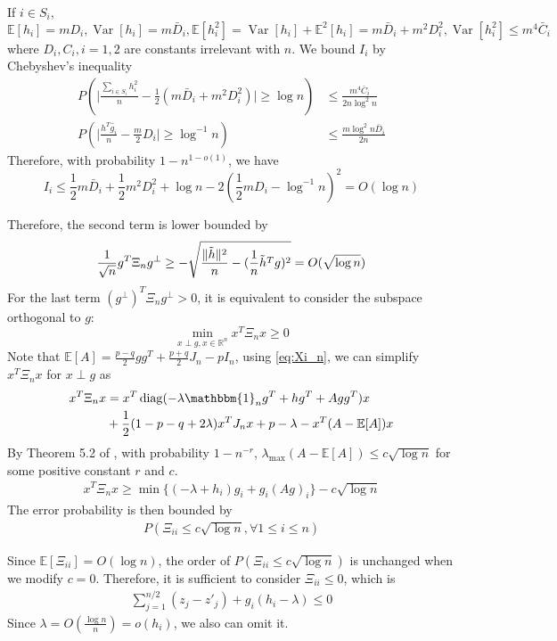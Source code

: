 \documentclass{article}
\DeclarePairedDelimiter\norm{\lVert}{\rVert}
\DeclareMathOperator{\Var}{Var}
\DeclareMathOperator{\diag}{diag}
\begin{document}
If $i\in S_i$, $\mathbb{E}[h_i]=m D_i, \Var[h_i]=m \bar{D}_i, \mathbb{E}[h_i^2]=\Var[h_i]+\mathbb{E}^2[h_i]=m \bar{D}_i+m^2 D^2_i, \Var[h_i^2] \leq m^4 \bar{C}_i$ where
$D_i, C_i,i=1,2$ are constants irrelevant with $n$.
We bound $I_i$ by Chebyshev's inequality
\begin{align*}
P(\Big| \frac{\sum_{i\in S_i} h_i^2}{n} - \frac{1}{2}(m \bar{D}_i + m^2D_i^2) \Big| \geq \log n) & \leq \frac{m^4 \bar{C}_i}{2n\log^2 n} \\
P(\Big| \frac{h^T \hat{g}_i}{n} - \frac{m}{2}D_i\Big| \geq \log^{-1} n) & \leq \frac{m \log^{2} n\bar{D}_i}{2n}
\end{align*}
Therefore, with probability $1-n^{1-o(1)}$, we have
$$
I_i \leq \frac{1}{2}m\bar{D}_i + \frac{1}{2}m^2 D_i^2 + \log n - 2(\frac{1}{2}m D_i - \log^{-1} n)^2 = O(\log n)
$$

Therefore, the second term is lower bounded by
$$
\frac{1}{\sqrt{n}} g^T \Xi_n g^{\perp} \geq -\sqrt{\frac{\norm{\tilde{h}}^2}{n} - (\frac{1}{n}\tilde{h}^Tg)^2} = O(\sqrt{\log n})
$$
For the last term $(g^{\perp})^T \Xi_n g^{\perp} >0$, it is equivalent
to consider the subspace orthogonal to $g$:
$$
\min_{x \perp g, x \in \mathbb{R}^n } x^T \Xi_n x \geq 0
$$
Note that $\mathbb{E}[A] = \frac{p-q}{2}gg^T + \frac{p+q}{2}J_n - pI_n$,
using \eqref{eq:Xi_n}, we can simplify $x^T \Xi_n x$ for $x \perp g$ as
\begin{align*}
x^T \Xi_n x &= x^T \diag( -\lambda \mathbbm{1}_ng^T+hg^T + Agg^T) x  \\
&+ \frac{1}{2}(1-p-q+2\lambda)x^TJ_n x
+ p -\lambda -x^T(A-\mathbb{E}[A])x
\end{align*}
By Theorem 5.2 of \cite{lei2015consistency},
with probability $1-n^{-r}$, $\lambda_{\max}(A-\mathbb{E}[A]) \leq c\sqrt{\log n}$ for some positive constant $r$ and $c$.
\begin{align*}
x^T \Xi_n x \geq \min\{(-\lambda + h_i) g_i + g_i (Ag)_i \} - c \sqrt{\log n}
\end{align*}
The error probability is then bounded by
\begin{align*}
P(\Xi_{ii} \leq c\sqrt{\log n}, \forall 1\leq i \leq n)
\end{align*}

Since $\mathbb{E}[\Xi_{ii}]=O(\log n)$, the order of $P(\Xi_{ii} \leq c\sqrt{\log n})$ is unchanged when we modify $c=0$. Therefore, it is sufficient to consider $\Xi_{ii} \leq 0 $, which is
\begin{align}\label{eq:equiv_condition}
\sum_{j=1}^{n/2} (z_j - z'_j) +g_i( h_i -\lambda )\leq 0
\end{align}
Since $\lambda = O(\frac{\log n}{n})=o(h_i)$, we also can omit it.
\end{document}
